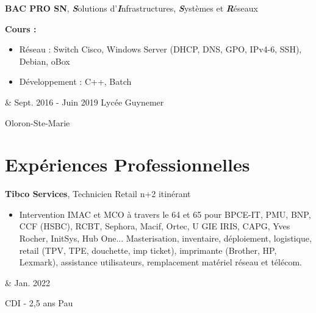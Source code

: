 \documentclass[10pt, fr-FR]{article}
\newenvironment{highlights}{\begin{itemize}[topsep=0pt,parsep=0.10 cm,partopsep=0pt,itemsep=0pt,after=\vspace{-1\baselineskip},leftmargin=0.4 cm + 3pt]}{\end{itemize}}
\let\originalTabularx\tabularx
\let\originalEndTabularx\endtabularx
\renewenvironment{tabularx}{\bgroup\centering\originalTabularx}{\originalEndTabularx\par\egroup}
\begin{document}
\begin{tabularx}{
	\textwidth-0.4 cm-0.13cm
	}{
	K{0.2 cm}
	R{4.1 cm}
	}
	\textbf{BAC PRO SN}, \textbf{\textit{S}}olutions d'\textbf{\textit{I}}nfrastructures, \textbf{\textit{S}}ystèmes et \textbf{\textit{R}}éseaux
	
	\hspace{0 cm} 
	\textbf{Cours :}
	\vspace{0.10 cm}
	
	\begin{highlights}
	\item Réseau : Switch Cisco, Windows Server (DHCP, DNS, GPO, IPv4-6, SSH), Debian, oBox
	\item Développement : C++, Batch
	\end{highlights}
	  &   
	Sept. 2016 - Juin 2019
	Lycée Guynemer
	            
	Oloron-Ste-Marie
\end{tabularx}

\section{Expériences Professionnelles}

\begin{tabularx}{
	\textwidth-0.4 cm-0.13cm
	}{
	K{0.2 cm}
	R{4.1 cm}
	}
	\textbf{Tibco Services}, Technicien Retail n+2 itinérant
	
	\vspace{0.10 cm}
	
	\begin{highlights}
	\item Intervention IMAC et MCO à travers le 64 et 65 pour BPCE-IT, PMU, BNP, CCF (HSBC), RCBT, Sephora, Macif, Ortec, U GIE IRIS, CAPG, Yves Rocher, InitSys, Hub One... Masterisation, inventaire, déploiement, logistique, retail (TPV, TPE, douchette, imp ticket), imprimante (Brother, HP, Lexmark), assistance utilisateurs, remplacement matériel réseau et télécom. 
	\end{highlights}
	  &   
	Jan. 2022
	            
	CDI - 2,5 ans     
	Pau
\end{tabularx}
\end{document}
